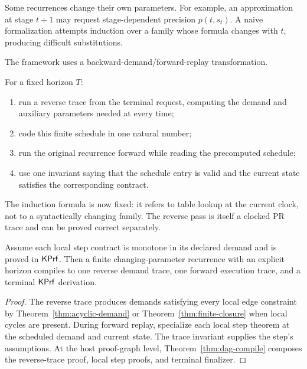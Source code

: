 Some recurrences change their own parameters.  For example, an approximation
at stage \(t+1\) may request stage-dependent precision \(p(t,s_t)\).  A naive
formalization attempts induction over a family whose formula changes with
\(t\), producing difficult substitutions.

The framework uses a backward-demand/forward-replay transformation.

\begin{construction}
For a fixed horizon \(T\):
\begin{enumerate}
\item run a reverse trace from the terminal request, computing the demand and
auxiliary parameters needed at every time;
\item code this finite schedule in one natural number;
\item run the original recurrence forward while reading the precomputed
schedule;
\item use one invariant saying that the schedule entry is valid and the
current state satisfies the corresponding contract.
\end{enumerate}
\end{construction}

The induction formula is now fixed: it refers to table lookup at the current
clock, not to a syntactically changing family.  The reverse pass is itself a
clocked PR trace and can be proved correct separately.

\begin{theorem}
Assume each local step contract is monotone in its declared demand and is
proved in \(\mathsf{KPrf}\).  Then a finite changing-parameter recurrence with an
explicit horizon compiles to one reverse demand trace, one forward execution
trace, and a terminal \(\mathsf{KPrf}\) derivation.
\end{theorem}

\begin{proof}
The reverse trace produces demands satisfying every local edge constraint by
Theorem~\ref{thm:acyclic-demand} or
Theorem~\ref{thm:finite-closure} when local cycles are present.  During forward
replay, specialize each local step theorem at the scheduled demand and current
state.  The trace invariant supplies the step's assumptions.  At the host
proof-graph level, Theorem~\ref{thm:dag-compile} composes the reverse-trace
proof, local step proofs, and terminal finalizer.
\end{proof}

